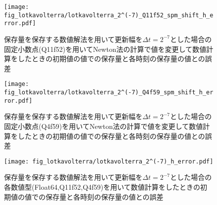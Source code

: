 \begin{figure}[H]
    \centering
    \begin{minipage}[b]{0.48\columnwidth}
        \centering
        \texttt{[image: fig\_lotkavolterra/lotkavolterra\_2^(-7)\_Q11f52\_spm\_shift\_h\_error.pdf]}
        \caption{保存量を保存する数値解法を用いて更新幅を$\Delta t =  2^{-7}$とした場合の固定小数点(Q11f52)を用いてNewton法の計算で値を変更して数値計算をしたときの初期値の値での保存量と各時刻の保存量の値との誤差}
        \label{fig:lotkavolterra_2^(-7)_Q11f52_smp_shift_h_error}
    \end{minipage}
    \hspace{0.01\columnwidth}
    \begin{minipage}[b]{0.48\columnwidth}
        \centering
        \texttt{[image: fig\_lotkavolterra/lotkavolterra\_2^(-7)\_Q4f59\_spm\_shift\_h\_error.pdf]}   
        \caption{保存量を保存する数値解法を用いて更新幅を$\Delta t =  2^{-7}$とした場合の固定小数点(Q4f59)を用いてNewton法の計算で値を変更して数値計算をしたときの初期値の値での保存量と各時刻の保存量の値との誤差}
        \label{fig:lotkavolterra_2^(-7)_Q3f60_smp_shift_h_error}
    \end{minipage}
\end{figure}

\begin{figure}[H]
    \centering
    \begin{minipage}[b]{0.9\columnwidth}
        \centering
        \texttt{[image: fig\_lotkavolterra/lotkavolterra\_2^(-7)\_h\_error.pdf]}
        \caption{保存量を保存する数値解法を用いて更新幅を$\Delta t =  2^{-7}$とした場合の各数値型(Float64,Q11f52,Q4f59)を用いて数値計算をしたときの初期値の値での保存量と各時刻の保存量の値との誤差}
    \end{minipage}
\end{figure}
